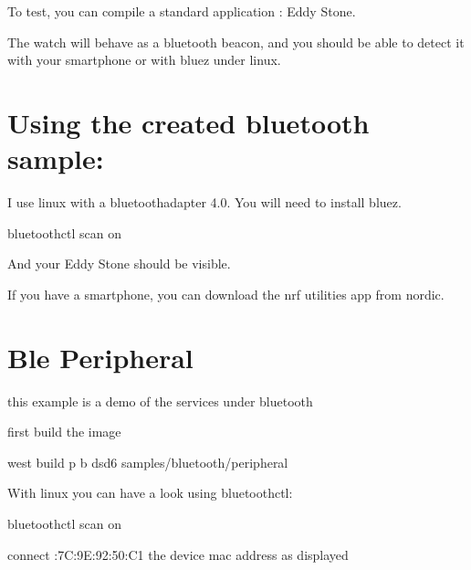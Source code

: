 \documentclass[letterpaper,10pt,english]{sphinxmanual}
\begin{document}
To test, you can compile a standard application : Eddy Stone.

The watch will behave as a bluetooth beacon, and you should be able to detect it with your smartphone or with bluez under linux.


\section{Using the created bluetooth sample:}
\label{\detokenize{bluetooth:using-the-created-bluetooth-sample}}
I use linux with a bluetoothadapter 4.0.
You will need to install bluez.

\begin{sphinxVerbatim}[commandchars=\\\{\}]
bluetoothctl
scan on
\end{sphinxVerbatim}

And your Eddy Stone should be visible.

If you have a smartphone, you can download the nrf utilities app from nordic.


\section{Ble Peripheral}
\label{\detokenize{bluetooth:ble-peripheral}}
this example is a demo of the services under bluetooth

first build the image

\begin{sphinxVerbatim}[commandchars=\\\{\}]
  west build \PYGZhy{}p \PYGZhy{}b ds\PYGZus{}d6 samples/bluetooth/peripheral
\end{sphinxVerbatim}

With linux you can have a look using bluetoothctl:

\begin{sphinxVerbatim}[commandchars=\\\{\}]
bluetoothctl
scan on


connect :7C:9E:92:50:C1 the device mac address as displayed

\end{sphinxVerbatim}
\end{document}
